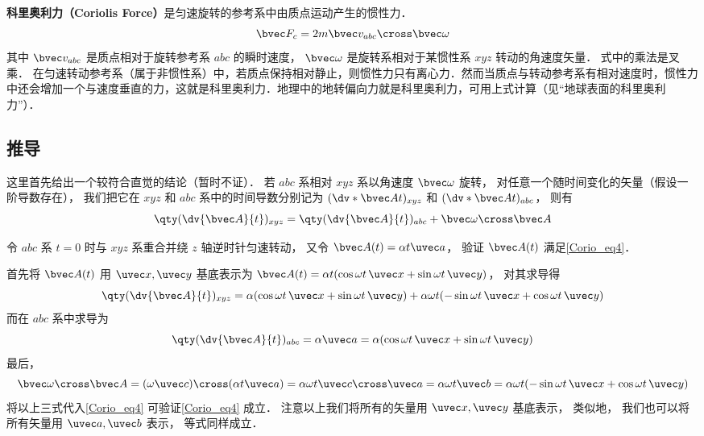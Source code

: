 

\textbf{科里奥利力（Coriolis Force）}是匀速旋转的参考系中由质点运动产生的惯性力．
\begin{equation}
\bvec F_c = 2m \bvec v_{abc} \cross \bvec \omega
\end{equation}
其中 $\bvec v_{abc}$ 是质点相对于旋转参考系 $abc$ 的瞬时速度， $\bvec\omega$ 是旋转系相对于某惯性系 $xyz$ 转动的角速度矢量．%
式中的乘法是叉乘．
在匀速转动参考系（属于非惯性系）中，若质点保持相对静止，则惯性力只有离心力．然而当质点与转动参考系有相对速度时，惯性力中还会增加一个与速度垂直的力，这就是科里奥利力．地理中的地转偏向力就是科里奥利力，可用上式计算（见“地球表面的科里奥利力”）．


\subsection{推导}

这里首先给出一个较符合直觉的结论（暂时不证）． 若 $abc$ 系相对 $xyz$ 系以角速度 $\bvec\omega$ 旋转， 对任意一个随时间变化的矢量（假设一阶导数存在）， 我们把它在 $xyz$ 和 $abc$ 系中的时间导数分别记为 $(\dv*{\bvec A}{t})_{xyz}$ 和 $(\dv*{\bvec A}{t})_{abc}$， 则有
\begin{equation}\label{Corio_eq4}
\qty(\dv{\bvec A}{t})_{xyz} = \qty(\dv{\bvec A}{t})_{abc} + \bvec\omega\cross\bvec A
\end{equation}

\begin{example}{}
令 $abc$ 系 $t = 0$ 时与 $xyz$ 系重合并绕 $z$ 轴逆时针匀速转动， 又令 $\bvec A(t) = \alpha t \uvec a$， 验证 $\bvec A(t)$ 满足\autoref{Corio_eq4}．

首先将 $\bvec A(t)$ 用 $\uvec x, \uvec y$ 基底表示为 $\bvec A(t) = \alpha t (\cos\omega t\, \uvec x + \sin\omega t\, \uvec y)$， 对其求导得
\begin{equation}
\qty(\dv{\bvec A}{t})_{xyz} = \alpha (\cos\omega t \,\uvec x + \sin\omega t \,\uvec y)
+ \alpha\omega t (-\sin\omega t \,\uvec x + \cos\omega t \,\uvec y)
\end{equation}
而在 $abc$ 系中求导为
\begin{equation}
\qty(\dv{\bvec A}{t})_{abc} = \alpha \uvec a = \alpha (\cos\omega t\, \uvec x + \sin\omega t \,\uvec y)
\end{equation}
最后，
\begin{equation}
\bvec\omega \cross \bvec A = (\omega \uvec c) \cross (\alpha t \uvec a) = \alpha\omega t \uvec c\cross\uvec a = \alpha\omega t \uvec b = \alpha\omega t(-\sin \omega t \,\uvec x + \cos\omega t \,\uvec y)
\end{equation}
将以上三式代入\autoref{Corio_eq4} 可验证\autoref{Corio_eq4} 成立． 注意以上我们将所有的矢量用 $\uvec x, \uvec y$ 基底表示， 类似地， 我们也可以将所有矢量用 $\uvec a, \uvec b$ 表示， 等式同样成立．
\end{example}

